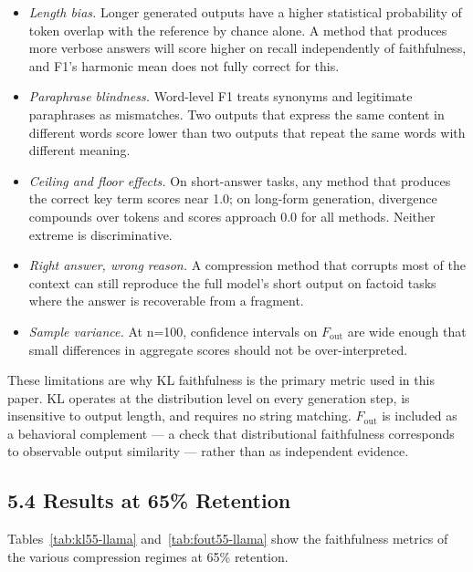 \documentclass[10pt,letterpaper]{article}
\providecommand{\tightlist}{%
  \setlength{\itemsep}{0pt}\setlength{\parskip}{0pt}}
\begin{document}
\begin{itemize}
\tightlist
\item
  \emph{Length bias.} Longer generated outputs have a higher statistical
  probability of token overlap with the reference by chance alone. A
  method that produces more verbose answers will score higher on recall
  independently of faithfulness, and F1's harmonic mean does not fully
  correct for this.
\item
  \emph{Paraphrase blindness.} Word-level F1 treats synonyms and
  legitimate paraphrases as mismatches. Two outputs that express the
  same content in different words score lower than two outputs that
  repeat the same words with different meaning.
\item
  \emph{Ceiling and floor effects.} On short-answer tasks, any method
  that produces the correct key term scores near 1.0; on long-form
  generation, divergence compounds over tokens and scores approach 0.0
  for all methods. Neither extreme is discriminative.
\item
  \emph{Right answer, wrong reason.} A compression method that corrupts
  most of the context can still reproduce the full model's short output
  on factoid tasks where the answer is recoverable from a fragment.
\item
  \emph{Sample variance.} At n=100, confidence intervals on
  \(F_{\text{out}}\) are wide enough that small differences in aggregate
  scores should not be over-interpreted.
\end{itemize}

These limitations are why KL faithfulness is the primary metric used in
this paper. KL operates at the distribution level on every generation
step, is insensitive to output length, and requires no string matching.
\(F_{\text{out}}\) is included as a behavioral complement --- a check
that distributional faithfulness corresponds to observable output
similarity --- rather than as independent evidence.

\hypertarget{results-at-65-retention}{%
\subsection{5.4 Results at 65\%
Retention}\label{results-at-65-retention}}

Tables~\ref{tab:kl55-llama} and~\ref{tab:fout55-llama} show the faithfulness 
metrics of the various compression regimes at 65\% retention.
\end{document}
